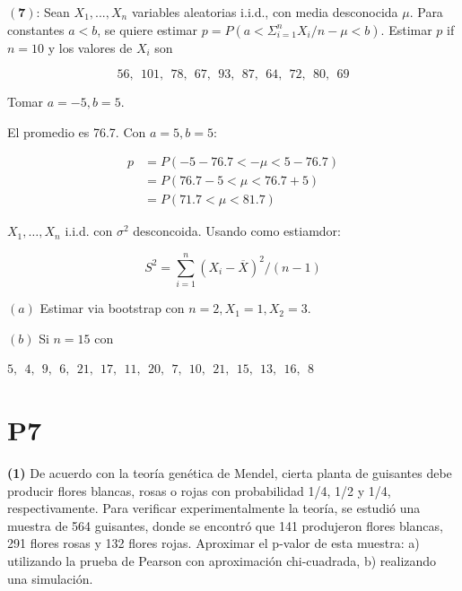\documentclass[a4paper, 12pt]{article}
\begin{document}
\pagebreak 

\begin{myframe}
    $(\textbf{7})$: Sean $X_1,...,X_n$ variables aleatorias i.i.d., con media
    desconocida $\mu$. Para constantes $a < b$, se quiere estimar 
    $p = P(a < \Sigma_{i=1}^n X_i/n - \mu < b)$. Estimar $p$ if $n = 10$ y los
    valores de $X_i$ son 
    
    $$56,~~ 101,~~ 78,~~ 67,~~    93,~~ 87,~~ 64,~~ 72,~~ 80,~ ~ 69$$

    Tomar $a = -5, b = 5.$
\end{myframe}

El promedio es 76.7. Con $a = 5, b = 5$:

\begin{align*}
    p &= P(-5 - 76.7 < -\mu < 5 - 76.7) \\
    &= P(76.7-5 < \mu < 76.7 + 5)\\ 
    &=P(71.7 < \mu < 81.7)
\end{align*}


\pagebreak 

\begin{myframe}
    $X_1, \ldots, X_n$ i.i.d. con $\sigma^2$ desconcoida. Usando como estiamdor:

    \begin{equation*}
        S^2 = \sum_{i=1}^n(X_i - \overline{X})^2 / (n-1)
    \end{equation*}

    $(a)$ Estimar via bootstrap con $n=2, X_1 = 1, X_2 = 3$. 

    $(b)$ Si $n = 15$ con   

       $5,~~ 4,~~ 9,~~ 6,~~ 21,~~ 17,~~ 11,~~ 20,~~ 7,~~ 10,~~ 21,~~ 15,~~ 13,~~ 16,~~ 8$


\end{myframe}




\pagebreak

\section{P7}

\begin{myframe}
    \textbf{(1)} De acuerdo con la teoría genética de Mendel, cierta planta de
    guisantes debe producir flores blancas, rosas o rojas con probabilidad 1/4,
    1/2 y 1/4, respectivamente. Para verificar experimentalmente la teoría, se
    estudió una muestra de 564 guisantes, donde se encontró que 141 produjeron
    flores blancas, 291 flores rosas y 132 flores rojas. Aproximar el p-valor de
    esta muestra: a) utilizando la prueba de Pearson con aproximación
    chi-cuadrada, b) realizando una simulación.
\end{myframe}
\end{document}
